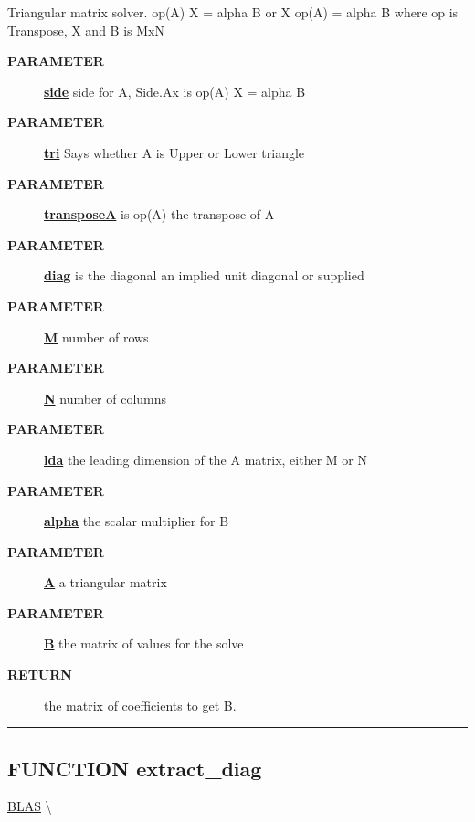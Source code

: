 \par
Triangular matrix solver. op(A) X = alpha B or X op(A) = alpha B where op is Transpose, X and B is MxN

\par
\begin{description}
\item [\colorbox{tagtype}{\color{white} \textbf{\textsf{PARAMETER}}}] \textbf{\underline{side}} side for A, Side.Ax is op(A) X = alpha B
\item [\colorbox{tagtype}{\color{white} \textbf{\textsf{PARAMETER}}}] \textbf{\underline{tri}} Says whether A is Upper or Lower triangle
\item [\colorbox{tagtype}{\color{white} \textbf{\textsf{PARAMETER}}}] \textbf{\underline{transposeA}} is op(A) the transpose of A
\item [\colorbox{tagtype}{\color{white} \textbf{\textsf{PARAMETER}}}] \textbf{\underline{diag}} is the diagonal an implied unit diagonal or supplied
\item [\colorbox{tagtype}{\color{white} \textbf{\textsf{PARAMETER}}}] \textbf{\underline{M}} number of rows
\item [\colorbox{tagtype}{\color{white} \textbf{\textsf{PARAMETER}}}] \textbf{\underline{N}} number of columns
\item [\colorbox{tagtype}{\color{white} \textbf{\textsf{PARAMETER}}}] \textbf{\underline{lda}} the leading dimension of the A matrix, either M or N
\item [\colorbox{tagtype}{\color{white} \textbf{\textsf{PARAMETER}}}] \textbf{\underline{alpha}} the scalar multiplier for B
\item [\colorbox{tagtype}{\color{white} \textbf{\textsf{PARAMETER}}}] \textbf{\underline{A}} a triangular matrix
\item [\colorbox{tagtype}{\color{white} \textbf{\textsf{PARAMETER}}}] \textbf{\underline{B}} the matrix of values for the solve
\item [\colorbox{tagtype}{\color{white} \textbf{\textsf{RETURN}}}] \textbf{\underline{}} the matrix of coefficients to get B.
\end{description}

\rule{\linewidth}{0.5pt}
\subsection*{\textsf{\colorbox{headtoc}{\color{white} FUNCTION}
extract\_diag}}

\hypertarget{ecldoc:blas.extract_diag}{}
\hspace{0pt} \hyperlink{ecldoc:BLAS}{BLAS} \textbackslash 

